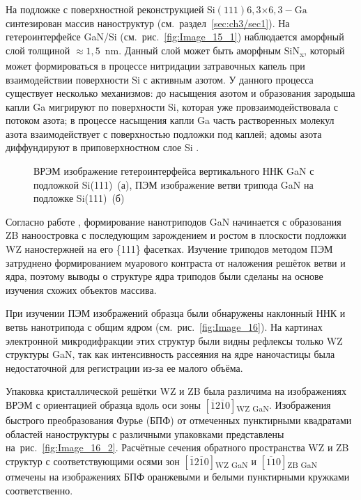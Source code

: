 На подложке с поверхностной реконструкцией Si\((111)6,3\)\(\times\)\(6,3 -
\text{Ga}\) синтезирован массив наноструктур (см.~раздел~\cref{sec:ch3/sec1}).
На гетероинтерфейсе GaN/Si (см.~рис.~\cref{fig:Image_15_1}) наблюдается
аморфный слой толщиной \(\approx 1,5\)~\si{\nano\meter}. Данный слой может быть
аморфным SiN\textsubscript{x}, который может формироваться в процессе
нитридации затравочных капель при взаимодействии поверхности Si с активным
азотом. У данного процесса существует несколько механизмов: до насыщения азотом
и образования зародыша капли Ga мигрируют по поверхности Si, которая уже
провзаимодействовала с потоком азота; в процессе насыщения капли Ga часть
растворенных молекул азота взаимодействует с поверхностью подложки под каплей;
адомы азота диффундируют в приповерхностном слое Si \cite{Rawdanowicz2004}.

\begin{figure}[ht]  \caption{ВРЭМ изображение
		гетероинтерфейса вертикального ННК GaN с подложкой Si(111)~(а), ПЭМ
	изображение ветви трипода GaN на подложке Si(111)~(б)}\label{fig:Image_15}
\end{figure}

Согласно работе \cite{Lee2010}, формирование нанотриподов GaN начинается с
образования ZB наноостровка с последующим зарождением и ростом в плоскости
подложки WZ наностержней на его \{111\} фасетках. Изучение триподов методом ПЭМ
затруднено формированием муарового контраста от наложения решёток ветви и ядра,
поэтому выводы о структуре ядра триподов были сделаны на основе изучения схожих
объектов массива.

При изучении ПЭМ изображений образца были обнаружены наклонный ННК и ветвь
нанотрипода с общим ядром (см.~рис.~\cref{fig:Image_16}). На картинах
электронной микродифракции этих структур были видны рефлексы только WZ
структуры GaN, так как интенсивность рассеяния на ядре наночастицы была
недостаточной для регистрации из-за ее малого объёма.

Упаковка кристаллической решётки WZ и ZB была различима на изображениях ВРЭМ с
ориентацией образца вдоль оси зоны
\([\overline{1}2\overline{1}0]\)\textsubscript{WZ GaN}. Изображения быстрого
преобразования Фурье (БПФ) от отмеченных пунктирными квадратами областей
наноструктуры с различными упаковками представлены
на~рис.~\cref{fig:Image_16_2}. Расчётные сечения обратного пространства WZ и ZB
структур с соответствующими осями зон
\([\overline{1}2\overline{1}0]\)\textsubscript{WZ GaN} и
\([\overline{11}0]\)\textsubscript{ZB GaN} отмечены на изображениях БПФ
оранжевыми и белыми пунктирными кружками соответственно.


